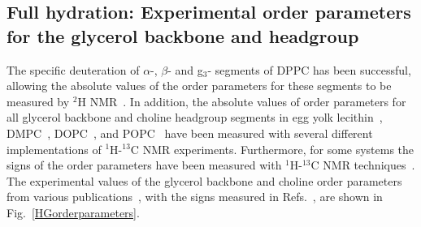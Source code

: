 \documentclass[journal=jpcbfk,manuscript=article]{achemso}
\begin{document}
\subsection{Full hydration: Experimental order parameters for the glycerol backbone and headgroup}\label{experiments}
The specific deuteration of $\alpha$-, $\beta$- and g$_3$- segments of DPPC has been successful, 
allowing the absolute values of the order parameters for these segments to be measured  by $^2$H NMR~\cite{gally75,brown77,brown78,akutsu81}.
In addition, the absolute values of order parameters for all glycerol backbone and choline headgroup segments in egg yolk lecithin~\cite{hong95a},
DMPC~\cite{hong95b,gross97,dvinskikh05a}, DOPC~\cite{warschawski05}, and POPC~\cite{warschawski05,ferreira13}
have been measured with several different implementations of $^1$H-$^{13}$C NMR experiments. Furthermore, for some systems the signs of the order parameters 
have been measured with $^1$H-$^{13}$C NMR techniques~\cite{hong95a,hong95b,gross97}. The experimental values of the glycerol backbone 
and choline order parameters from various publications~\cite{gally75,akutsu81,gross97,dvinskikh05a,ferreira13}, with the signs measured in Refs.~, are shown in Fig.~\ref{HGorderparameters}.
\end{document}
